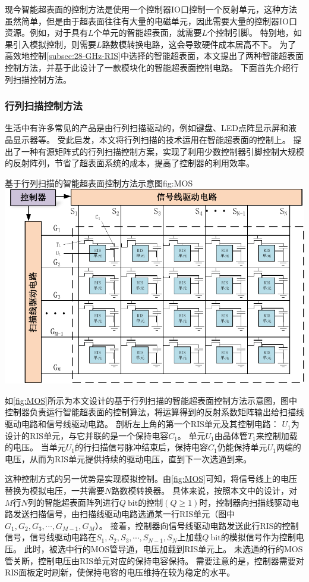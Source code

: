 \documentclass[supercite]{HustGraduPaper}
\begin{document}
现今智能超表面的控制方法是使用一个控制器IO口控制一个反射单元，这种方法虽然简单，但是由于超表面往往有大量的电磁单元，因此需要大量的控制器IO口资源。例如，对于具有$L$个单元的智能超表面，就需要$L$个控制引脚。
特别地，如果引入模拟控制，则需要$L$路数模转换电路，这会导致硬件成本居高不下。
为了高效地控制\autoref{subsec:28-GHz-RIS}中选择的智能超表面，本文提出了两种智能超表面控制方法，并基于此设计了一款模块化的智能超表面控制电路。
下面首先介绍行列扫描控制方法。

\subsubsection{行列扫描控制方法}

生活中有许多常见的产品是由行列扫描驱动的，例如键盘、LED点阵显示屏和液晶显示器等。
受此启发，本文将行列扫描的技术运用在智能超表面的控制上。
提出了一种有源矩阵式的行列扫描控制方案，实现了利用少数控制器引脚控制大规模的反射阵列，节省了超表面系统的成本，提高了控制器的利用效率。

\begin{generalfig}[htb]{基于行列扫描的智能超表面控制方法示意图}{fig:MOS}
	\includegraphics[width=0.8\linewidth]{Figures/MOS.pdf}
\end{generalfig}
如\autoref{fig:MOS}所示为本文设计的基于行列扫描的智能超表面控制方法示意图，图中控制器负责运行智能超表面的控制算法，将运算得到的反射系数矩阵输出给扫描线驱动电路和信号线驱动电路。
剖析左上角的第一个RIS单元及其控制电路：
$U_1$为设计的RIS单元，与它并联的是一个保持电容$C_1$。
单元$U_1$由晶体管$T_1$来控制加载的电压。
当单元$U_1$的行扫描信号脉冲结束后，保持电容$C_1$仍能保持单元$U_1$两端的电压，从而为RIS单元提供持续的驱动电压，直到下一次选通到来。

这种控制方式的另一优势是实现模拟控制。由\autoref{fig:MOS}可知，将信号线上的电压替换为模拟电压，一共需要$N$路数模转换器。
具体来说，按照本文中的设计，对$M$行$N$列的智能超表面阵列进行$Q ~ \mathrm{bit}$的控制$(Q \ge 1)$时，控制器向扫描线驱动电路发送扫描信号，由扫描线驱动电路选通某一行RIS单元（图中$G_1,G_2,G_3,\cdots,G_{M-1},G_M$）。
接着，控制器向信号线驱动电路发送此行RIS的控制信号，信号线驱动电路在$S_1,S_2,S_3,\cdots,S_{N-1},S_N$上加载$Q ~ \mathrm{bit}$的模拟信号作为控制电压。
此时，被选中行的MOS管导通，电压加载到RIS单元上。
未选通的行的MOS管关断，控制电压由RIS单元对应的保持电容保持。
需要注意的是，控制器需要对RIS面板定时刷新，使保持电容的电压维持在较为稳定的水平。
\end{document}
